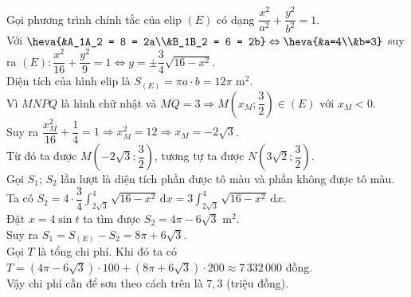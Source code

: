 \begin{ex}
{\begin{center}
\end{center}
Gọi phương trình chính tắc của elip $(E)$ có dạng $\dfrac{x^2}{a^2}+\dfrac{y^2}{b^2} = 1$.\\
Với $\heva{&A_1A_2 = 8 = 2a\\&B_1B_2 = 6 = 2b} \Leftrightarrow \heva{&a=4\\&b=3}$ suy ra $(E) \colon \dfrac{x^2}{16} + \dfrac{y^2}{9} = 1 \Leftrightarrow y = \pm \dfrac{3}{4}\sqrt{16 - x^2}$.\\
Diện tích của hình elip là $S_{(E)} = \pi a \cdot b = 12\pi$ m$^2$.\\
Vì $MNPQ$ là hình chữ nhật và $MQ = 3 \Rightarrow M \left(x_M; \dfrac{3}{2} \right) \in (E)$ với $x_M < 0$.\\
Suy ra $\dfrac{x_M^2}{16} + \dfrac{1}{4} = 1 \Rightarrow x_M^2 = 12 \Rightarrow x_M = -2\sqrt{3}$.\\
Từ đó ta được $M\left(-2\sqrt{3}; \dfrac{3}{2} \right)$, tương tự ta được $N\left(3\sqrt{2}; \dfrac{3}{2} \right)$.\\
Gọi $S_1$; $S_2$ lần lượt là diện tích phần được tô màu và phần không được tô màu.\\
Ta có $S_2 = 4 \cdot \dfrac{3}{4}\displaystyle\int^{4}_{2\sqrt{3}} \sqrt{16 - x^2}\mathrm{\,d}x = 3\displaystyle\int^{4}_{2\sqrt{3}} \sqrt{16 - x^2}\mathrm{\,d}x$.\\
Đặt $x = 4\sin{t}$ ta tìm được $S_2 = 4\pi - 6\sqrt{3}$ m$^2$.\\
Suy ra $S_1 = S_{(E)} - S_2 = 8\pi + 6\sqrt{3}$.\\
Gọi $T$ là tổng chi phí. Khi đó ta có
$T = \left(4\pi - 6\sqrt{3} \right) \cdot 100 + \left(8\pi + 6\sqrt{3} \right) \cdot 200 \approx 7\,332\,000$ đồng.\\
Vậy chi phí cần để sơn theo cách trên là $7{,}3$ (triệu đồng).
}
\end{ex}

